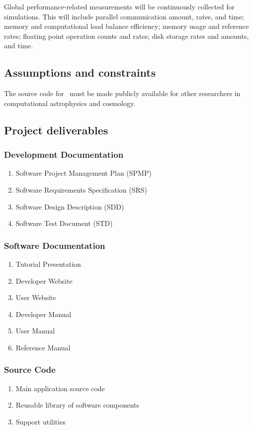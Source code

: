 \documentclass{article}[12pt]
\begin{document}

%
   Global performance-related measurements will be continuously
   collected for simulations.  This will include parallel
   communication amount, rates, and time; memory and computational
   load balance efficiency; memory usage and reference rates; floating
   point operation counts and rates; disk storage rates and amounts,
   and time.


\subsection{Assumptions and constraints}

The source code for \cello\ must be made publicly available for
other researchers in computational astrophysics and cosmology.

\subsection{Project deliverables}

\subsubsection{Development Documentation}

\begin{enumerate}
\item Software Project Management Plan (SPMP)
\item Software Requirements Specification (SRS)
\item Software Design Description (SDD)
\item Software Test Document (STD)
\end{enumerate}

\subsubsection{Software Documentation}
\begin{enumerate}
\item Tutorial Presentation
\item Developer Website
\item User Website
\item Developer Manual
\item User Manual
\item Reference Manual
\end{enumerate}

\subsubsection{Source Code}
\begin{enumerate}
\item Main application source code
\item Reusable library of software components
\item Support utilities
\end{enumerate}
\end{document}
